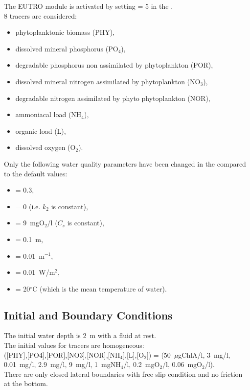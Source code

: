 The EUTRO module is activated by setting  = 5
in the  .\\

8 tracers are considered:
\begin{itemize}
\item phytoplanktonic biomass (PHY),
\item dissolved mineral phosphorus (PO$_4$),
\item degradable phosphorus non assimilated by phytoplankton (POR),
\item dissolved mineral nitrogen assimilated by phytoplankton (NO$_3$),
\item degradable nitrogen assimilated by phyto phytoplankton (NOR),
\item ammoniacal load (NH$_4$),
\item organic load (L),
\item dissolved oxygen (O$_2$).
\end{itemize}

Only the following water quality parameters have been changed
in the \waqtel {} compared to the default values:
\begin{itemize}
\item {} = 0.3,
\item {} = 0 (i.e. $k_2$ is constant),
\item {} = 9~mgO$_2$/l ($C_s$ is constant),
\item {} = 0.1~m,
\item {} = 0.01~m$^{-1}$,
\item {} = 0.01~W/m$^2$,
\item {} = 20$^\circ$C (which is the mean temperature of water).
\end{itemize}

\subsection{Initial and Boundary Conditions}

The initial water depth is 2~m with a fluid at rest.\\
%
The initial values for tracers are homogeneous:\\
([PHY],[PO4],[POR],[NO3],[NOR],[NH$_4$],[L],[O$_2$]) =
(50~$\mu$gChlA/l, 3~mg/l, 0.01~mg/l, 2.9~mg/l, 9~mg/l, 1~mgNH$_4$/l, 0.2~mgO$_2$/l, 0.06~mgO$_2$/l).\\
%
There are only closed lateral boundaries with free slip condition and no
friction at the bottom.

